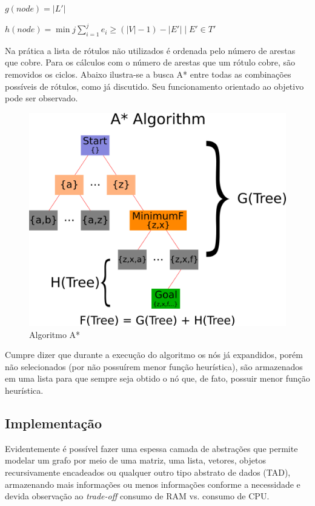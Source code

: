 \documentclass[12pt]{article}
\begin{document}
		$g(node) = |L'|$

		$h(node) = \displaystyle{\min j \sum_{i = 1}^{j}{e_i} \geq (|V| - 1) - |E'| \mid E' \in T'}$

		Na prática a lista de rótulos não utilizados é ordenada pelo número de arestas que cobre. Para os cálculos com o número de arestas que um rótulo cobre, são removidos os ciclos. Abaixo ilustra-se a busca A* entre todas as combinações possíveis de rótulos, como já discutido. Seu funcionamento orientado ao objetivo pode ser observado.

		\begin{center}
		\begin{figure}[H]
		\includegraphics[width=1\textwidth]{aestrela.png}
		\caption{Algoritmo A*}
		\label{fig:aestrela}
		\end{figure}
		\end{center}

		Cumpre dizer que durante a execução do algoritmo os nós já expandidos, porém não selecionados (por não possuírem menor função heurística), são armazenados em uma lista para que sempre seja obtido o nó que, de fato, possuir menor função heurística.

	\subsection{Implementação}\label{sec:implementacao}

		Evidentemente é possível fazer uma espessa camada de abstrações que permite modelar um grafo por meio de uma matriz, uma lista, vetores, objetos recursivamente encadeados ou qualquer outro tipo abstrato de dados (TAD), armazenando mais informações ou menos informações conforme a necessidade e devida observação ao \textit{trade-off} consumo de RAM vs. consumo de CPU.
\end{document}
